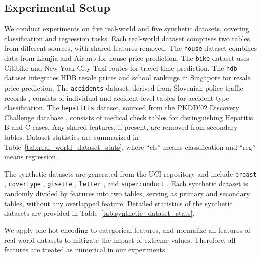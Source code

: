 \subsection{Experimental Setup}

We conduct experiments on five real-world and five synthetic datasets, covering classification and regression tasks. Each real-world dataset comprises two tables from different sources, with shared features removed. The \texttt{house} dataset combines data from Lianjia \cite{qiu2017} and Airbnb \cite{airbnb2019} for house price prediction. The \texttt{bike} dataset uses Citibike \cite{citibike2016} and New York City Taxi routes \cite{nytlc2016} for travel time prediction. The \texttt{hdb} dataset integrates HDB resale prices \cite{hdb2018} and school rankings \cite{salary2020} in Singapore for resale price prediction. The \texttt{accidents} dataset, derived from Slovenian police traffic records \cite{slovenian_police_traffic_safety}, consists of individual and accident-level tables for accident type classification. The \texttt{hepatitis} dataset, sourced from the PKDD'02 Discovery Challenge database \cite{berka2002hepatitis}, consists of medical check tables for distinguishing Hepatitis B and C cases. Any shared features, if present, are removed from secondary tables. Dataset statistics are summarized in Table~\ref{tab:real_world_dataset_stats}, where ``cls'' means classification and ``reg'' means regression.

The synthetic datasets are generated from the UCI repository and include \texttt{breast} \cite{zwitter1988breast}, \texttt{covertype} \cite{blackard1998covertype}, \texttt{gisette} \cite{guyon2004gisette}, \texttt{letter} \cite{slate1991letter}, and \texttt{superconduct} \cite{hamidieh2018superconductivity}. Each synthetic dataset is randomly divided by features into two tables, serving as primary and secondary tables, without any overlapped feature. Detailed statistics of the synthetic datasets are provided in Table~\ref{tab:synthetic_dataset_stats}.

We apply one-hot encoding to categorical features, and normalize all features of real-world datasets to mitigate the impact of extreme values. Therefore, all features are treated as numerical in our experiments.



